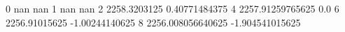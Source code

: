 0 nan nan
1 nan nan
2 2258.3203125 0.40771484375
4 2257.91259765625 0.0
6 2256.91015625 -1.00244140625
8 2256.008056640625 -1.904541015625
